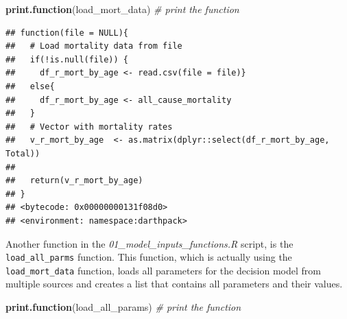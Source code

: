 \documentclass[]{book}
\newenvironment{Shaded}{\begin{snugshade}}{\end{snugshade}}
\newcommand{\CommentTok}[1]{\textcolor[rgb]{0.56,0.35,0.01}{\textit{#1}}}
\newcommand{\KeywordTok}[1]{\textcolor[rgb]{0.13,0.29,0.53}{\textbf{#1}}}
\newcommand{\NormalTok}[1]{#1}
\begin{document}
\begin{Shaded}
\begin{Highlighting}[]
\KeywordTok{print.function}\NormalTok{(load_mort_data) }\CommentTok{# print the function}
\end{Highlighting}
\end{Shaded}

\begin{verbatim}
## function(file = NULL){
##   # Load mortality data from file
##   if(!is.null(file)) {
##     df_r_mort_by_age <- read.csv(file = file)}
##   else{
##     df_r_mort_by_age <- all_cause_mortality
##   }
##   # Vector with mortality rates
##   v_r_mort_by_age  <- as.matrix(dplyr::select(df_r_mort_by_age, Total))
##   
##   return(v_r_mort_by_age)
## }
## <bytecode: 0x00000000131f08d0>
## <environment: namespace:darthpack>
\end{verbatim}

Another function in the \emph{01\_model\_inputs\_functions.R} script, is the \texttt{load\_all\_parms} function. This function, which is actually using the \texttt{load\_mort\_data} function, loads all parameters for the decision model from multiple sources and creates a list that contains all parameters and their values.

\begin{Shaded}
\begin{Highlighting}[]
\KeywordTok{print.function}\NormalTok{(load_all_params)  }\CommentTok{# print the function}
\end{Highlighting}
\end{Shaded}
\end{document}
